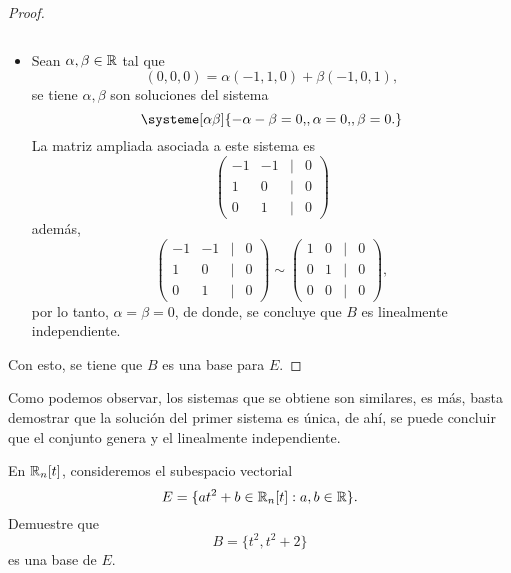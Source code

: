 \documentclass[a4,11pt]{aleph-notas}
\begin{document}
\begin{proof}
\begin{itemize}[leftmargin=*]
\[        \]
    \item
        Sean $\alpha,\beta\in\mathbb{R}$ tal que
        \[
            (0,0,0) = \alpha(-1,1,0)+\beta(-1,0,1),
        \]
        se tiene $\alpha,\beta$ son soluciones del sistema
        \[
            \systeme[\alpha\beta]{
                -\alpha-\beta = 0{,},
                \alpha = 0{,},
                \beta = 0{.}
            }
        \]
        La matriz ampliada asociada a este sistema es
        \[
            \begin{pmatrix}
                -1 & -1 & | & 0\\
                1 & 0 & | & 0\\
                0 & 1 & | & 0
            \end{pmatrix}
        \]
        además,
        \[
            \begin{pmatrix}
                -1 & -1 & | & 0\\
                1 & 0 & | & 0\\
                0 & 1 & | & 0
            \end{pmatrix}
            \sim
            \begin{pmatrix}
                1 & 0 & | & 0\\
                0 & 1 & | & 0\\
                0 & 0 & | & 0
            \end{pmatrix},
        \]
        por lo tanto, $\alpha=\beta=0$, de donde, se concluye que $B$ es linealmente independiente.
    \end{itemize}
    Con esto, se tiene que $B$ es una base para $E$.
\end{proof}

\begin{advertencia}
    Como podemos observar, los sistemas que se obtiene son similares, es más, basta demostrar que la solución del primer sistema es única, de ahí, se puede concluir que el conjunto genera y el linealmente independiente.
\end{advertencia}


\begin{ejer}
    En $\mathbb{R}_n[t]$, consideremos el subespacio vectorial
    \[
        E = \{at^2+b\in \mathbb{R}_n[t] : a,b\in\mathbb{R} \}.
    \]
    Demuestre que 
    \[
        B = \{t^2 , t^2+2\}
    \]
    es una base de $E$.
\end{ejer}
\end{document}
